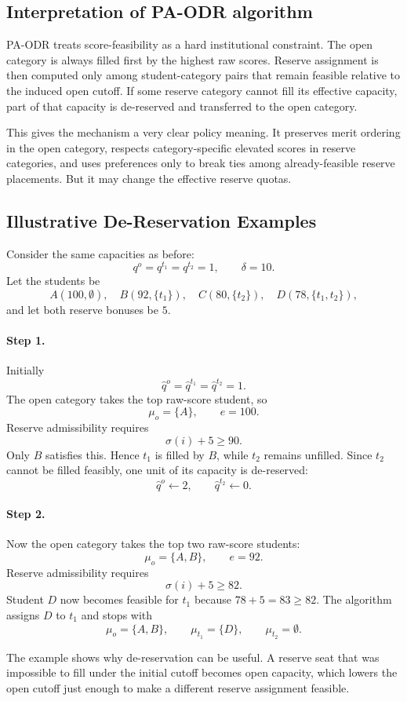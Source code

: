 \documentclass[runningheads]{llncs}
\newcommand{\1}{\mathbf{1}}
\begin{document}
\subsection{Interpretation of PA-ODR algorithm}

PA-ODR treats score-feasibility as a hard institutional constraint. The open category is always filled first by the highest raw scores. Reserve assignment is then computed only among student-category pairs that remain feasible relative to the induced open cutoff. If some reserve category cannot fill its effective capacity, part of that capacity is de-reserved and transferred to the open category.

This gives the mechanism a very clear policy meaning. It preserves merit ordering in the open category, respects category-specific elevated scores in reserve categories, and uses preferences only to break ties among already-feasible reserve placements. But it may change the effective reserve quotas.

\subsection{Illustrative De-Reservation Examples}
\begin{example}
Consider the same capacities as before:
\[
q^o=q^{t_1}=q^{t_2}=1,\qquad \delta=10.
\]
Let the students be
\[
A(100,\emptyset),\quad B(92,\{t_1\}),\quad C(80,\{t_2\}),\quad D(78,\{t_1,t_2\}),
\]
and let both reserve bonuses be $5$.

\paragraph{Step 1.}
Initially
\[
\hat q^o=\hat q^{t_1}=\hat q^{t_2}=1.
\]
The open category takes the top raw-score student, so
\[
\mu_o=\{A\},\qquad e=100.
\]
Reserve admissibility requires
\[
\sigma(i)+5\ge 90.
\]
Only $B$ satisfies this. Hence $t_1$ is filled by $B$, while $t_2$ remains unfilled. Since $t_2$ cannot be filled feasibly, one unit of its capacity is de-reserved:
\[
\hat q^o\gets 2,\qquad \hat q^{t_2}\gets 0.
\]

\paragraph{Step 2.}
Now the open category takes the top two raw-score students:
\[
\mu_o=\{A,B\},\qquad e=92.
\]
Reserve admissibility requires
\[
\sigma(i)+5\ge 82.
\]
Student $D$ now becomes feasible for $t_1$ because $78+5=83\ge 82$. The algorithm assigns $D$ to $t_1$ and stops with
\[
\mu_o=\{A,B\},\qquad \mu_{t_1}=\{D\},\qquad \mu_{t_2}=\emptyset.
\]
\end{example}
The example shows why de-reservation can be useful. A reserve seat that was impossible to fill under the initial cutoff becomes open capacity, which lowers the open cutoff just enough to make a different reserve assignment feasible.
\end{document}

